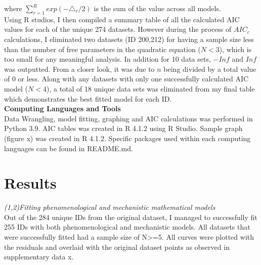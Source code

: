 \documentclass[11pt]{article}
\begin{document}
\noindent where $\sum_{r=1}^{R}exp(-\triangle_{r}/2)$ is the sum of the value across all models. \\ 

Using R studios, I then compiled a summary table of all the calculated AIC values for each of the unique 274 datasets. 
However during the process of $AIC_{c}$ calculations, I eliminated two datasets (ID 200,212) for having a sample size 
less than the number of free parameters in the quadratic equation ($N<$3), which is too small for any meaningful analysis. 
In addition for 10 data sets, $-Inf$ and $Inf$ was outputted. From a closer look, it was due to $n$ being divided by a total value 
of 0 or less. Along with any datasets with only one successfully calculated AIC model ($N<$4), a total of 18 unique data 
sets was eliminated from my final table which demonstrates the best fitted model for each ID. \\

\noindent\textbf{Computing Languages and Tools}\\

Data Wrangling, model fitting, graphing and AIC calculations was performed in Python 3.9. AIC tables was created in R 4.1.2 
using R Studio. Sample graph (figure x) was created in R 4.1.2. Specific packages used within each computing languages can 
be found in README.md.

\section{Results}

\noindent\emph{(1,2)Fitting phenomenological and mechanistic mathematical models}\\

Out of the 284 unique IDs from the original dataset, I managed to successfully fit 255 IDs with both phenomenological and mechanistic
models. All datasets that were successfully fitted had a sample size of N>=5. All curves were plotted with the residuals and 
overlaid with the original dataset points as observed in supplementary data x.\\
\end{document}
